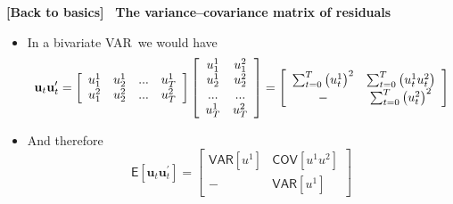 \documentclass[10pt,handout]{beamer}
\begin{document}
\begin{frame}
{{\footnotesize \textbf{[Back to basics]}} \textbf{\ {The
variance--covariance matrix of residuals} }}

\begin{itemize}
\item In a bivariate VAR\ we would have 
\begin{equation*}
\mathbf{u}_{t}\mathbf{u}_{t}^{\prime }=\left[ 
\begin{array}{cccc}
{\footnotesize u}_{1}^{1} & {\footnotesize u}_{2}^{1} & {\footnotesize ...}
& {\footnotesize u}_{T}^{1} \\ 
{\footnotesize u}_{1}^{2} & {\footnotesize u}_{2}^{2} & {\footnotesize ...}
& {\footnotesize u}_{T}^{2}%
\end{array}%
\right] \left[ 
\begin{array}{cc}
{\footnotesize u}_{1}^{1} & {\footnotesize u}_{1}^{2} \\ 
{\footnotesize u}_{2}^{1} & {\footnotesize u}_{2}^{2} \\ 
{\footnotesize ...} & {\footnotesize ...} \\ 
{\footnotesize u}_{T}^{1} & {\footnotesize u}_{T}^{2}%
\end{array}%
\right] =\left[ 
\begin{array}{cc}
\sum_{t=0}^{T}\left( u_{t}^{1}\right) ^{2} & \sum_{t=0}^{T}\left(
u_{t}^{1}u_{t}^{2}\right) \\ 
- & \sum_{t=0}^{T}\left( u_{t}^{2}\right) ^{2}%
\end{array}%
\right]
\end{equation*}

\item And therefore 
\begin{equation*}
\mathsf{E}\left[ \mathbf{u}_{t}\mathbf{u}_{t}^{\prime }\right] =\left[ 
\begin{array}{cc}
\mathsf{VAR}\left[ u^{1}\right] & \mathsf{COV}\left[ u^{1}u^{2}\right] \\ 
- & \mathsf{VAR}\left[ u^{1}\right]%
\end{array}%
\right]
\end{equation*}
\end{itemize}
\end{frame}
\end{document}
